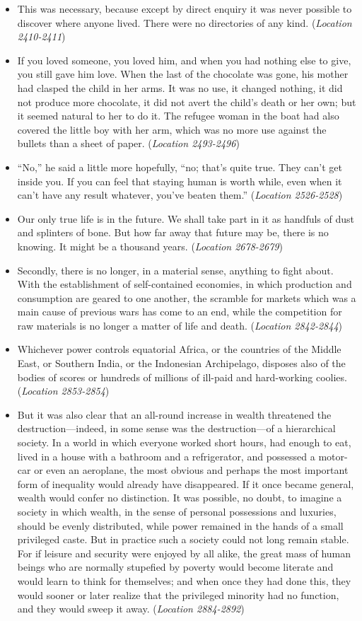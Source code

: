 \documentclass[12pt]{article}
\begin{document}
\begin{itemize}
\item {This was necessary, because except by direct enquiry it was never possible to discover where anyone lived. There were no directories of any kind. (\textit{Location 2410-2411})}
\item {If you loved someone, you loved him, and when you had nothing else to give, you still gave him love. When the last of the chocolate was gone, his mother had clasped the child in her arms. It was no use, it changed nothing, it did not produce more chocolate, it did not avert the child’s death or her own; but it seemed natural to her to do it. The refugee woman in the boat had also covered the little boy with her arm, which was no more use against the bullets than a sheet of paper. (\textit{Location 2493-2496})}
\item {“No,” he said a little more hopefully, “no; that’s quite true. They can’t get inside you. If you can feel that staying human is worth while, even when it can’t have any result whatever, you’ve beaten them.” (\textit{Location 2526-2528})}
\item {Our only true life is in the future. We shall take part in it as handfuls of dust and splinters of bone. But how far away that future may be, there is no knowing. It might be a thousand years. (\textit{Location 2678-2679})}
\item {Secondly, there is no longer, in a material sense, anything to fight about. With the establishment of self-contained economies, in which production and consumption are geared to one another, the scramble for markets which was a main cause of previous wars has come to an end, while the competition for raw materials is no longer a matter of life and death. (\textit{Location 2842-2844})}
\item {Whichever power controls equatorial Africa, or the countries of the Middle East, or Southern India, or the Indonesian Archipelago, disposes also of the bodies of scores or hundreds of millions of ill-paid and hard-working coolies. (\textit{Location 2853-2854})}
\item {But it was also clear that an all-round increase in wealth threatened the destruction—indeed, in some sense was the destruction—of a hierarchical society. In a world in which everyone worked short hours, had enough to eat, lived in a house with a bathroom and a refrigerator, and possessed a motor-car or even an aeroplane, the most obvious and perhaps the most important form of inequality would already have disappeared. If it once became general, wealth would confer no distinction. It was possible, no doubt, to imagine a society in which wealth, in the sense of personal possessions and luxuries, should be evenly distributed, while power remained in the hands of a small privileged caste. But in practice such a society could not long remain stable. For if leisure and security were enjoyed by all alike, the great mass of human beings who are normally stupefied by poverty would become literate and would learn to think for themselves; and when once they had done this, they would sooner or later realize that the privileged minority had no function, and they would sweep it away. (\textit{Location 2884-2892})}

\end{itemize}
\end{document}
